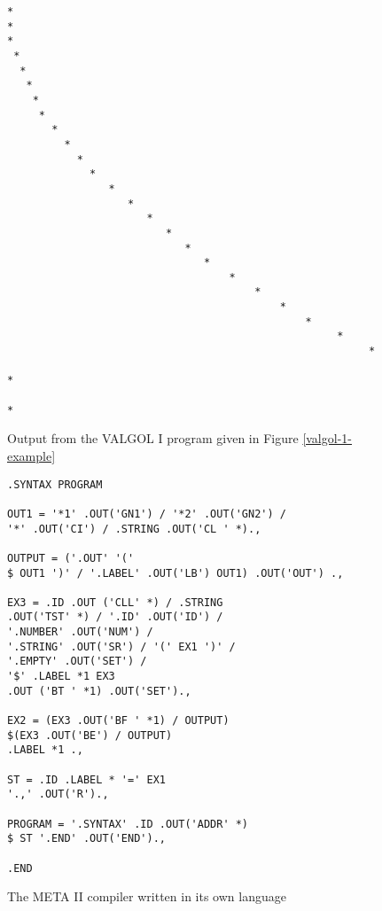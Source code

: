 \documentclass[notitlepage,twocolumn]{report}
\begin{document}
\begin{figure}
\caption{Output from the VALGOL I program given in Figure \ref{valgol-1-example}}
\begin{verbatim}
*
*
*
 *
  *
   *
    *
     *
       *
         *
           *
             *
                *
                   *
                      *
                         *
                            *
                               *
                                   *
                                       *
                                           *
                                               *
                                                    *
                                                         *
                                                              *
                                                                   *
\end{verbatim}
\end{figure}


\begin{figure}
\caption{The META II compiler written in its own language}
\begin{verbatim}
.SYNTAX PROGRAM

OUT1 = '*1' .OUT('GN1') / '*2' .OUT('GN2') /
'*' .OUT('CI') / .STRING .OUT('CL ' *).,

OUTPUT = ('.OUT' '('
$ OUT1 ')' / '.LABEL' .OUT('LB') OUT1) .OUT('OUT') .,

EX3 = .ID .OUT ('CLL' *) / .STRING
.OUT('TST' *) / '.ID' .OUT('ID') /
'.NUMBER' .OUT('NUM') /
'.STRING' .OUT('SR') / '(' EX1 ')' /
'.EMPTY' .OUT('SET') /
'$' .LABEL *1 EX3
.OUT ('BT ' *1) .OUT('SET').,

EX2 = (EX3 .OUT('BF ' *1) / OUTPUT)
$(EX3 .OUT('BE') / OUTPUT)
.LABEL *1 .,

ST = .ID .LABEL * '=' EX1
'.,' .OUT('R').,

PROGRAM = '.SYNTAX' .ID .OUT('ADDR' *)
$ ST '.END' .OUT('END').,

.END
\end{verbatim}
\end{figure}
\end{document}
